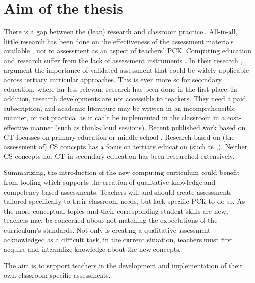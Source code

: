 \section{Aim of the thesis}\label{sec:aim}


There is a gap between the (lean) research and classroom practice \cite{Yadav2015}. All-in-all, little research has been done on the effectiveness of the assessment materials available \cite{Yadav2016}, nor to assessment as an aspect of teachers' PCK. Computing education and research suffer from the lack of assessment instruments \cite{voogt2017effecten}. In their research  , argument the importance of validated assessment that could be widely applicable across tertiary curricular approaches. This is even more so for secondary education, where far less relevant research has been done in the first place. In addition, research developments are not accessible to teachers. They need a paid subscription, and academic literature may be written in an incomprehensible manner, or not practical as it can't be implemented in the classroom in a cost-effective manner (such as think-aloud sessions). Recent published work based on CT focusses on primary education or middle school \cite{LyeKoh2014}. Research based on (the assessment of) CS concepts has a focus on tertiary education (such as \cite{McCracken2001},\cite{2010TewGuzdial}). Neither CS concepts nor CT in secondary education has been researched extensively.



Summarizing, the introduction of the new computing curriculum could benefit from tooling which supports the creation of qualitative knowledge and competency based assessments. Teachers will and should create assessments tailored specifically to their classroom needs, but lack specific PCK to do so. As the more conceptual topics and their corresponding student skills are new, teachers may be concerned about not matching the expectations of the curriculum's standards. Not only is creating a qualitative assessment acknowledged as a difficult task, in the current situation, teachers must first acquire and internalize knowledge about the new concepts.

The aim is to support teachers in the development and implementation of their own classroom specific assessments.

